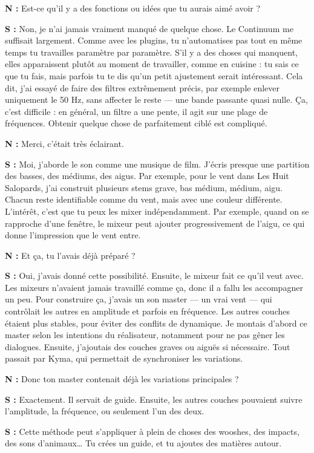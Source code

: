 ﻿\documentclass[12pt]{article}
\begin{document}
\textbf{N :} Est-ce qu’il y a des fonctions ou idées que tu aurais aimé avoir ?

\textbf{S :} Non, je n’ai jamais vraiment manqué de quelque chose. Le Continuum me suffisait largement. Comme avec les plugins, tu n’automatises pas tout en même temps tu travailles paramètre par paramètre.
S’il y a des choses qui manquent, elles apparaissent plutôt au moment de travailler, comme en cuisine : tu sais ce que tu fais, mais parfois tu te dis qu’un petit ajustement serait intéressant.
Cela dit, j’ai essayé de faire des filtres extrêmement précis, par exemple enlever uniquement le 50 Hz, sans affecter le reste — une bande passante quasi nulle. Ça, c’est difficile : en général, un filtre a une pente, il agit sur une plage de fréquences. Obtenir quelque chose de parfaitement ciblé est compliqué.

\textbf{N :} Merci, c’était très éclairant.

\textbf{S :} Moi, j’aborde le son comme une musique de film. J’écris presque une partition des basses, des médiums, des aigus.
Par exemple, pour le vent dans Les Huit Salopards, j’ai construit plusieurs stems grave, bas médium, médium, aigu. Chacun reste identifiable comme du vent, mais avec une couleur différente.
L’intérêt, c’est que tu peux les mixer indépendamment. Par exemple, quand on se rapproche d’une fenêtre, le mixeur peut ajouter progressivement de l’aigu, ce qui donne l’impression que le vent entre.

\textbf{N :} Et ça, tu l’avais déjà préparé ?

\textbf{S :} Oui, j’avais donné cette possibilité. Ensuite, le mixeur fait ce qu’il veut avec.
Les mixeurs n’avaient jamais travaillé comme ça, donc il a fallu les accompagner un peu.
Pour construire ça, j’avais un son master — un vrai vent — qui contrôlait les autres en amplitude et parfois en fréquence. Les autres couches étaient plus stables, pour éviter des conflits de dynamique.
Je montais d’abord ce master selon les intentions du réalisateur, notamment pour ne pas gêner les dialogues. Ensuite, j’ajoutais des couches graves ou aiguës si nécessaire.
Tout passait par Kyma, qui permettait de synchroniser les variations.

\textbf{N :} Donc ton master contenait déjà les variations principales ?

\textbf{S :} Exactement. Il servait de guide. Ensuite, les autres couches pouvaient suivre l’amplitude, la fréquence, ou seulement l’un des deux.

\textbf{S :} Cette méthode peut s’appliquer à plein de choses des wooshes, des impacts, des sons d’animaux… Tu crées un guide, et tu ajoutes des matières autour.
\end{document}

